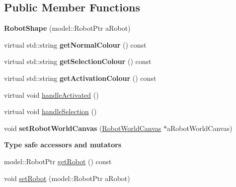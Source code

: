 \subsection*{Public Member Functions}
\begin{DoxyCompactItemize}
\item 
{\bfseries Robot\+Shape} (model\+::\+Robot\+Ptr a\+Robot)\hypertarget{class_view_1_1_robot_shape_aec0d01a762c2113a506948b65adea65d}{}\label{class_view_1_1_robot_shape_aec0d01a762c2113a506948b65adea65d}

\item 
virtual std\+::string {\bfseries get\+Normal\+Colour} () const \hypertarget{class_view_1_1_robot_shape_a5a7682a891c8b4bef7304894d2ab2737}{}\label{class_view_1_1_robot_shape_a5a7682a891c8b4bef7304894d2ab2737}

\item 
virtual std\+::string {\bfseries get\+Selection\+Colour} () const \hypertarget{class_view_1_1_robot_shape_a33ac56f82802eb45edaf2fada9635fad}{}\label{class_view_1_1_robot_shape_a33ac56f82802eb45edaf2fada9635fad}

\item 
virtual std\+::string {\bfseries get\+Activation\+Colour} () const \hypertarget{class_view_1_1_robot_shape_a41320fd63ea2f27563c65953d012899a}{}\label{class_view_1_1_robot_shape_a41320fd63ea2f27563c65953d012899a}

\item 
virtual void \hyperlink{class_view_1_1_robot_shape_ab07702949d9d374331a17db4759f0762}{handle\+Activated} ()
\item 
virtual void \hyperlink{class_view_1_1_robot_shape_a8983c43b4ec8cd9eda0f4e32a8f69b19}{handle\+Selection} ()
\item 
void {\bfseries set\+Robot\+World\+Canvas} (\hyperlink{class_view_1_1_robot_world_canvas}{Robot\+World\+Canvas} $\ast$a\+Robot\+World\+Canvas)\hypertarget{class_view_1_1_robot_shape_a95202f41f8b9d066be8625cf6aae0fcb}{}\label{class_view_1_1_robot_shape_a95202f41f8b9d066be8625cf6aae0fcb}

\end{DoxyCompactItemize}
\begin{Indent}{\bf Type safe accessors and mutators}\par
\begin{DoxyCompactItemize}
\item 
model\+::\+Robot\+Ptr \hyperlink{class_view_1_1_robot_shape_a23eca8fea0a58ba16b405b0f0eadf5da}{get\+Robot} () const
\item 
void \hyperlink{class_view_1_1_robot_shape_a96002bd3f90ced18aa3f0ab9b57902a3}{set\+Robot} (model\+::\+Robot\+Ptr a\+Robot)
\end{DoxyCompactItemize}
\end{Indent}

